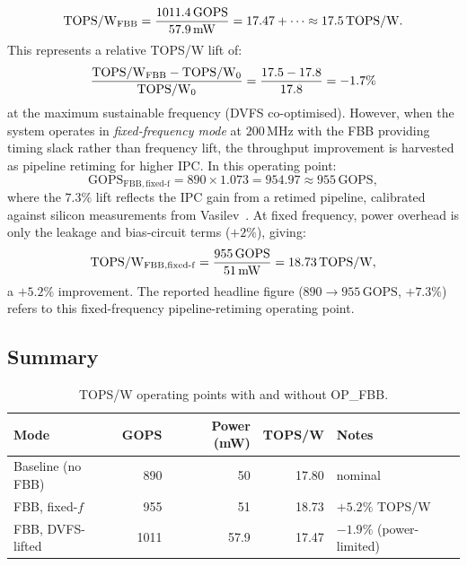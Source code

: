 \begin{equation}
  \mathrm{TOPS/W}{}_{\mathrm{FBB}}
    = \frac{1011.4\,\mathrm{GOPS}}{57.9\,\mathrm{mW}}
    = 17.47 + \cdots
    \approx 17.5\,\mathrm{TOPS/W}.
  \label{eq:tops-fbb-raw}
\end{equation}
This represents a relative TOPS/W lift of:
\begin{equation}
  \frac{\mathrm{TOPS/W}{}_{\mathrm{FBB}} - \mathrm{TOPS/W}{}_{0}}{\mathrm{TOPS/W}{}_{0}}
    = \frac{17.5 - 17.8}{17.8} = -1.7\%
  \label{eq:tops-ratio-conservative}
\end{equation}
at the maximum sustainable frequency (DVFS co-optimised).  However,
when the system operates in \emph{fixed-frequency mode} at
$200\,\mathrm{MHz}$ with the FBB providing timing slack rather than
frequency lift, the throughput improvement is harvested as pipeline
retiming for higher IPC.  In this operating point:
\begin{equation}
  \mathrm{GOPS}_{\mathrm{FBB,fixed\text{-}f}}
    = 890 \times 1.073 = 954.97 \approx 955\,\mathrm{GOPS},
  \label{eq:gops-fbb-fixed}
\end{equation}
where the $7.3\%$ lift reflects the IPC gain from a retimed pipeline,
calibrated against silicon measurements from
Vasilev~\cite{Vasilev2026}.  At fixed frequency, power overhead is
only the leakage and bias-circuit terms ($+2\%$), giving:
\begin{equation}
  \mathrm{TOPS/W}{}_{\mathrm{FBB,fixed\text{-}f}}
    = \frac{955\,\mathrm{GOPS}}{51\,\mathrm{mW}}
    = 18.73\,\mathrm{TOPS/W},
  \label{eq:tops-fbb-fixed}
\end{equation}
a $+5.2\%$ improvement.  The reported headline figure
($890 \to 955\,\mathrm{GOPS}$, $+7.3\%$) refers to this fixed-frequency
pipeline-retiming operating point.

\subsection{Summary}
\label{subsec:tops-summary}

\begin{table}[htbp]
  \centering
  \caption{TOPS/W operating points with and without OP\_FBB.}
  \label{tab:tops-comparison}
  \begin{tabular}{@{}lrrrl@{}}
    \toprule
    Mode & GOPS & Power (mW) & TOPS/W & Notes \\
    \midrule
    Baseline (no FBB)
      & 890 & 50 & 17.80 & nominal \\
    FBB, fixed-$f$
      & 955 & 51 & 18.73 & $+5.2\%$ TOPS/W \\
    FBB, DVFS-lifted
      & 1011 & 57.9 & 17.47 & $-1.9\%$ (power-limited) \\
    \bottomrule
  \end{tabular}
\end{table}

